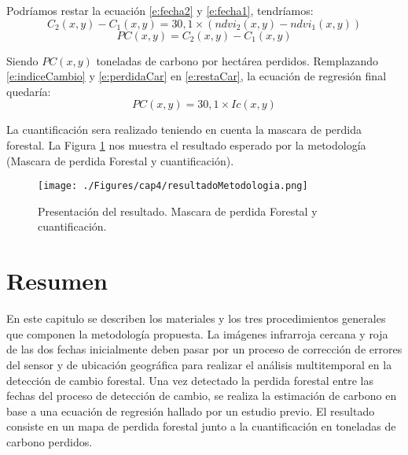 Podr\'iamos restar la ecuaci\'on \ref{e:fecha2} y \ref{e:fecha1}, tendr\'iamos:
		\begin{equation}
		\label{e:restaCar}
		C_{2}(x,y) - C_{1}(x,y)= 30,1 \times (ndvi_{2}(x,y)-ndvi_{1}(x,y))
		\end{equation}		
		\begin{equation}
		\label{e:perdidaCar}
		PC(x,y)= C_{2}(x,y) - C_{1}(x,y)
		\end{equation}		
		
Siendo $ PC(x,y)$ toneladas de carbono por hect\'area perdidos. Remplazando \ref{e:indiceCambio} y \ref{e:perdidaCar} en \ref{e:restaCar}, la ecuaci\'on de regresi\'on final quedar\'ia:
\begin{equation}
PC(x,y) = 30,1 \times Ic(x,y)
\end{equation}

La cuantificaci\'on sera realizado teniendo en cuenta la mascara de perdida forestal. La Figura \ref{fig:resulPC} nos muestra el resultado esperado por la metodolog\'ia (Mascara de perdida Forestal y cuantificaci\'on).
\begin{figure}[H]
	\centering
	\texttt{[image: ./Figures/cap4/resultadoMetodologia.png]}
	\caption{Presentaci\'on del resultado. Mascara de perdida Forestal y cuantificaci\'on.}
	\label{fig:resulPC}
\end{figure}
\section{Resumen}
En este capitulo se describen los materiales y los tres procedimientos generales que componen la metodolog\'ia propuesta. La im\'agenes infrarroja cercana y roja de las dos fechas inicialmente deben pasar por un proceso de correcci\'on de errores del sensor y de ubicaci\'on geogr\'afica para realizar el an\'alisis multitemporal en la detecci\'on de cambio forestal. Una vez detectado la perdida forestal entre las fechas del proceso de detecci\'on de cambio, se realiza la estimaci\'on de carbono en base a una ecuaci\'on de regresi\'on hallado por un estudio previo. El resultado consiste en un mapa de perdida forestal junto a la cuantificaci\'on en toneladas de carbono perdidos.